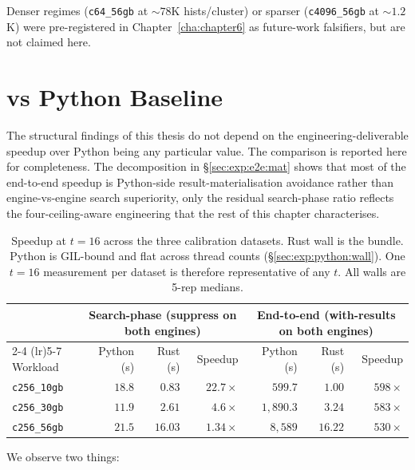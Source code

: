 Denser regimes (\texttt{c64\_56gb} at ${\sim}78$K hists/cluster) or sparser (\texttt{c4096\_56gb} at ${\sim}1.2$K) were pre-registered in Chapter~\ref{cha:chapter6} as future-work falsifiers, but are not claimed here.

\section{\bcombo{} vs Python Baseline\label{sec:exp:e2e}}


The structural findings of this thesis do not depend on the engineering-deliverable speedup over Python being any particular value. The comparison is reported here for completeness. The decomposition in §\ref{sec:exp:e2e:mat} shows that most of the end-to-end speedup is Python-side result-materialisation avoidance rather than engine-vs-engine search superiority, only the residual search-phase ratio reflects the four-ceiling-aware engineering that the rest of this chapter characterises.

\begin{table}[H]
  \centering
  \caption[Speedup vs.\ the Python baseline at $t{=}16$.]{Speedup at $t{=}16$ across the three calibration datasets. Rust wall is the \bcombo{} bundle. Python is GIL-bound and flat across thread counts (§\ref{sec:exp:python:wall}). One $t{=}16$ measurement per dataset is therefore representative of any $t$. All walls are 5-rep medians.}
  \label{tab:e2e}
  \footnotesize
  \setlength{\tabcolsep}{3pt}
  \begin{tabular}{lrrrrrr}
    \toprule
     & \multicolumn{3}{c}{Search-phase (suppress on both engines)} & \multicolumn{3}{c}{End-to-end (with-results on both engines)} \\
    \cmidrule(lr){2-4} \cmidrule(lr){5-7}
    Workload & Python (s) & Rust (s) & Speedup & Python (s) & Rust (s) & Speedup \\
    \midrule
    \texttt{c256\_10gb} & $18.8$  & $0.83$  & $22.7\times$ & $599.7$         & $1.00$  & $598\times$ \\
    \texttt{c256\_30gb} & $11.9$  & $2.61$  & $4.6\times$  & $1{,}890.3$     & $3.24$  & $583\times$ \\
    \texttt{c256\_56gb} & $21.5$  & $16.03$ & $1.34\times$ & $8{,}589$       & $16.22$ & $530\times$ \\
    \bottomrule
  \end{tabular}
\end{table}

We observe two things:

